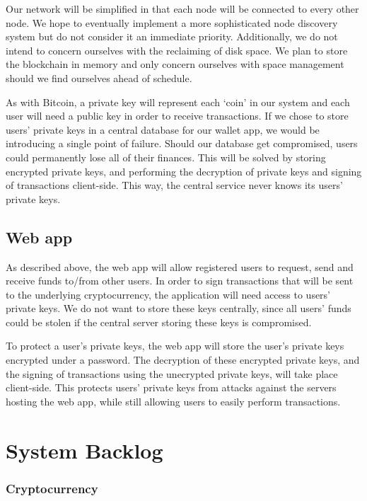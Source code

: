 \documentclass[12pt]{article}
\begin{document}
Our network will be simplified in that each node will be connected to every other node. We hope to eventually implement a more sophisticated node discovery system but do not consider it an immediate priority. Additionally, we do not intend to concern ourselves with the reclaiming of disk space. We plan to store the blockchain in memory and only concern ourselves with space management should we find ourselves ahead of schedule.

As with Bitcoin, a private key will represent each ‘coin’ in our system and each user will need a public key in order to receive transactions. If we chose to store users' private keys in a central database for our wallet app, we would be introducing a single point of failure. Should our database get compromised, users could permanently lose all of their finances. This will be solved by storing encrypted private keys, and performing the decryption of private keys and signing of transactions client-side. This way, the central service never knows its users' private keys.

\subsection*{Web app}

As described above, the web app will allow registered users to request, send and receive funds to/from other users. In order to sign transactions that will be sent to the underlying cryptocurrency, the application will need access to users' private keys. We do not want to store these keys centrally, since all users' funds could be stolen if the central server storing these keys is compromised.

To protect a user's private keys, the web app will store the user's private keys encrypted under a password. The decryption of these encrypted private keys, and the signing of transactions using the unecrypted private keys, will take place client-side. This protects users' private keys from attacks against the servers hosting the web app, while still allowing users to easily perform transactions.

\section{System Backlog}

\subsubsection*{Cryptocurrency}
\end{document}
